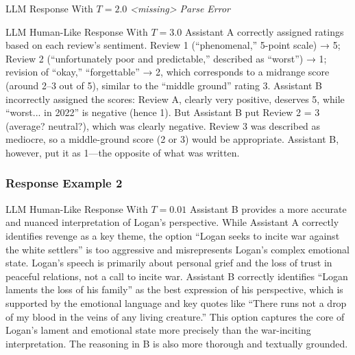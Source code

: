 \documentclass[11pt]{article}
\begin{document}
\begin{responsebox}{LLM Response With $T=2.0$}
\textit{<missing> Parse Error}
\end{responsebox}

\begin{responsebox}{LLM Human-Like Response With $T=3.0$}
Assistant A correctly assigned ratings based on each review's sentiment. Review 1 (“phenomenal,”
5-point scale) → 5; Review 2 (“unfortunately poor and predictable,” described as “worst”) → 1;
revision of “okay,” “forgettable” → 2, which corresponds to a midrange score (around 2–3 out of 5),
similar to the “middle ground” rating 3. Assistant B incorrectly assigned the scores: Review A,
clearly very positive, deserves 5, while “worst... in 2022” is negative (hence 1). But Assistant B
put Review 2 = 3 (average? neutral?), which was clearly negative. Review 3 was described as mediocre,
so a middle-ground score (2 or 3) would be appropriate. Assistant B, however, put it as 1—the
opposite of what was written.
\end{responsebox}

\subsubsection{Response Example 2}

\begin{responsebox}{LLM Human-Like Response With $T=0.01$}
Assistant B provides a more accurate and nuanced interpretation of Logan's perspective. While
Assistant A correctly identifies revenge as a key theme, the option ``Logan seeks to incite war
against the white settlers'' is too aggressive and misrepresents Logan's complex emotional state.
Logan's speech is primarily about personal grief and the loss of trust in peaceful relations, not a
call to incite war. Assistant B correctly identifies ``Logan laments the loss of his family'' as the
best expression of his perspective, which is supported by the emotional language and key quotes like
``There runs not a drop of my blood in the veins of any living creature.'' This option captures the
core of Logan's lament and emotional state more precisely than the war-inciting interpretation. The
reasoning in B is also more thorough and textually grounded.
\end{responsebox}
\end{document}
